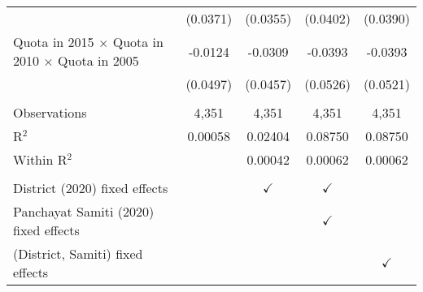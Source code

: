 \begin{tabular}{lcccc}
                                                                   & (0.0371)       & (0.0355)      & (0.0402)      & (0.0390)\\   
   Quota in 2015 $\times $ Quota in 2010 $\times $ Quota in 2005   & -0.0124        & -0.0309       & -0.0393       & -0.0393\\   
                                                                   & (0.0497)       & (0.0457)      & (0.0526)      & (0.0521)\\   
    \\
   Observations                                                    & 4,351          & 4,351         & 4,351         & 4,351\\  
   R$^2$                                                           & 0.00058        & 0.02404       & 0.08750       & 0.08750\\  
   Within R$^2$                                                    &                & 0.00042       & 0.00062       & 0.00062\\  
    \\
   District (2020) fixed effects                                   &                & $\checkmark$  & $\checkmark$  & \\  
   Panchayat Samiti (2020) fixed effects                           &                &               & $\checkmark$  & \\  
   (District, Samiti) fixed effects                                &                &               &               & $\checkmark$\\   
   \bottomrule
\end{tabular}
\par\endgroup


